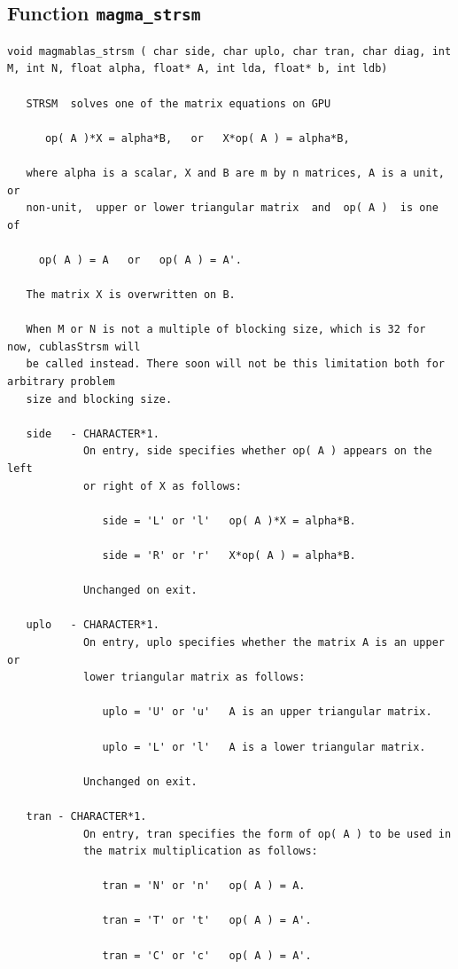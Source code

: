 \documentclass[10pt]{book}
\begin{document}
\subsection{Function {\tt {\bf magma\_strsm}}}
\begin{verbatim}
void magmablas_strsm ( char side, char uplo, char tran, char diag, int M, int N, float alpha, float* A, int lda, float* b, int ldb)
   
   STRSM  solves one of the matrix equations on GPU
   
      op( A )*X = alpha*B,   or   X*op( A ) = alpha*B,
   
   where alpha is a scalar, X and B are m by n matrices, A is a unit, or
   non-unit,  upper or lower triangular matrix  and  op( A )  is one  of
   
     op( A ) = A   or   op( A ) = A'.
  
   The matrix X is overwritten on B.
   
   When M or N is not a multiple of blocking size, which is 32 for now, cublasStrsm will
   be called instead. There soon will not be this limitation both for arbitrary problem 
   size and blocking size.
   
   side   - CHARACTER*1.
            On entry, side specifies whether op( A ) appears on the left
            or right of X as follows:
   
               side = 'L' or 'l'   op( A )*X = alpha*B.
   
               side = 'R' or 'r'   X*op( A ) = alpha*B.
   
            Unchanged on exit.
   
   uplo   - CHARACTER*1.
            On entry, uplo specifies whether the matrix A is an upper or
            lower triangular matrix as follows:
   
               uplo = 'U' or 'u'   A is an upper triangular matrix.
   
               uplo = 'L' or 'l'   A is a lower triangular matrix.
   
            Unchanged on exit.
   
   tran - CHARACTER*1.
            On entry, tran specifies the form of op( A ) to be used in
            the matrix multiplication as follows:
   
               tran = 'N' or 'n'   op( A ) = A.
   
               tran = 'T' or 't'   op( A ) = A'.
   
               tran = 'C' or 'c'   op( A ) = A'.
   

\end{verbatim}
\end{document}
